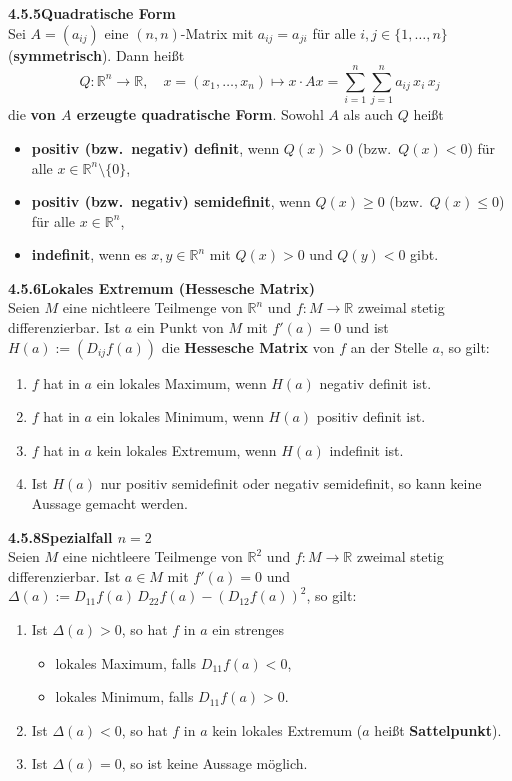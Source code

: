 \documentclass[a4paper,12pt]{article}
\newcommand{\gentry}[3]{%
  \noindent\textbf{#1\quad #2}\nopagebreak\\[0.2em]
  #3\par\smallskip
}
\begin{document}
\gentry{4.5.5}{Quadratische Form}{%
  Sei $A = (a_{ij})$ eine $(n, n)$-Matrix mit $a_{ij} = a_{ji}$ für alle $i, j \in \{1, \ldots, n\}$
  (\textbf{symmetrisch}). Dann heißt
  \[
    Q: \mathbb{R}^n \to \mathbb{R}, \quad x = (x_1, \ldots, x_n) \mapsto x \cdot Ax = \sum_{i=1}^{n} \sum_{j=1}^{n} a_{ij}\,x_i\,x_j
  \]
  die \textbf{von $A$ erzeugte quadratische Form}. Sowohl $A$ als auch $Q$ heißt
  \begin{itemize}[topsep=2pt,itemsep=1pt]
    \item \textbf{positiv (bzw.\ negativ) definit}, wenn $Q(x) > 0$ (bzw.\ $Q(x) < 0$) für alle $x \in \mathbb{R}^n \setminus \{0\}$,
    \item \textbf{positiv (bzw.\ negativ) semidefinit}, wenn $Q(x) \geq 0$ (bzw.\ $Q(x) \leq 0$) für alle $x \in \mathbb{R}^n$,
    \item \textbf{indefinit}, wenn es $x, y \in \mathbb{R}^n$ mit $Q(x) > 0$ und $Q(y) < 0$ gibt.
  \end{itemize}
}

\gentry{4.5.6}{Lokales Extremum (Hessesche Matrix)}{%
  Seien $M$ eine nichtleere Teilmenge von $\mathbb{R}^n$ und $f: M \to \mathbb{R}$ zweimal stetig
  differenzierbar. Ist $a$ ein Punkt von $M$ mit $f'(a) = 0$ und ist
  $H(a) := (D_{ij} f(a))$ die \textbf{Hessesche Matrix} von $f$ an der Stelle $a$, so gilt:
  \begin{enumerate}[label=(\roman*),topsep=2pt,itemsep=1pt]
    \item $f$ hat in $a$ ein lokales Maximum, wenn $H(a)$ negativ definit ist.
    \item $f$ hat in $a$ ein lokales Minimum, wenn $H(a)$ positiv definit ist.
    \item $f$ hat in $a$ kein lokales Extremum, wenn $H(a)$ indefinit ist.
    \item Ist $H(a)$ nur positiv semidefinit oder negativ semidefinit, so kann keine Aussage gemacht werden.
  \end{enumerate}
}

\gentry{4.5.8}{Spezialfall $n = 2$}{%
  Seien $M$ eine nichtleere Teilmenge von $\mathbb{R}^2$ und $f: M \to \mathbb{R}$ zweimal stetig
  differenzierbar. Ist $a \in M$ mit $f'(a) = 0$ und
  $\Delta(a) := D_{11} f(a)\,D_{22} f(a) - (D_{12} f(a))^2$, so gilt:
  \begin{enumerate}[label=(\roman*),topsep=2pt,itemsep=1pt]
    \item Ist $\Delta(a) > 0$, so hat $f$ in $a$ ein strenges
          \begin{itemize}[topsep=1pt,itemsep=0pt]
            \item lokales Maximum, falls $D_{11} f(a) < 0$,
            \item lokales Minimum, falls $D_{11} f(a) > 0$.
          \end{itemize}
    \item Ist $\Delta(a) < 0$, so hat $f$ in $a$ kein lokales Extremum ($a$ heißt \textbf{Sattelpunkt}).
    \item Ist $\Delta(a) = 0$, so ist keine Aussage möglich.
  \end{enumerate}
}
\end{document}
